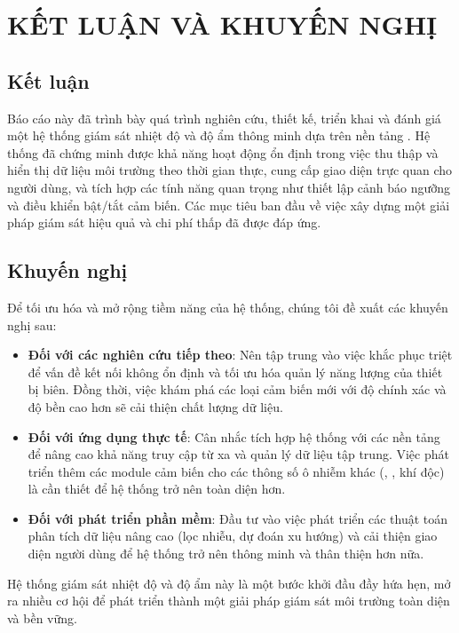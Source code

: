 
\chapter{KẾT LUẬN VÀ KHUYẾN NGHỊ} %

\label{Chapter5} %


\section{Kết luận}
Báo cáo này đã trình bày quá trình nghiên cứu, thiết kế, triển khai và đánh giá một hệ thống giám sát nhiệt độ và độ ẩm thông minh dựa trên nền tảng . Hệ thống đã chứng minh được khả năng hoạt động ổn định trong việc thu thập và hiển thị dữ liệu môi trường theo thời gian thực, cung cấp giao diện trực quan cho người dùng, và tích hợp các tính năng quan trọng như thiết lập cảnh báo ngưỡng và điều khiển bật/tắt cảm biến. Các mục tiêu ban đầu về việc xây dựng một giải pháp giám sát hiệu quả và chi phí thấp đã được đáp ứng.

\section{Khuyến nghị}
Để tối ưu hóa và mở rộng tiềm năng của hệ thống, chúng tôi đề xuất các khuyến nghị sau:
\begin{itemize}
	\item \textbf{Đối với các nghiên cứu tiếp theo}: Nên tập trung vào việc khắc phục triệt để vấn đề kết nối  không ổn định và tối ưu hóa quản lý năng lượng của thiết bị biên. Đồng thời, việc khám phá các loại cảm biến mới với độ chính xác và độ bền cao hơn sẽ cải thiện chất lượng dữ liệu.
	\item \textbf{Đối với ứng dụng thực tế}: Cân nhắc tích hợp hệ thống với các nền tảng   để nâng cao khả năng truy cập từ xa và quản lý dữ liệu tập trung. Việc phát triển thêm các module cảm biến cho các thông số ô nhiễm khác (, , khí độc) là cần thiết để hệ thống trở nên toàn diện hơn.
	\item \textbf{Đối với phát triển phần mềm}: Đầu tư vào việc phát triển các thuật toán phân tích dữ liệu nâng cao (lọc nhiễu, dự đoán xu hướng) và cải thiện giao diện người dùng để hệ thống trở nên thông minh và thân thiện hơn nữa.
\end{itemize}
Hệ thống giám sát nhiệt độ và độ ẩm này là một bước khởi đầu đầy hứa hẹn, mở ra nhiều cơ hội để phát triển thành một giải pháp giám sát môi trường toàn diện và bền vững.